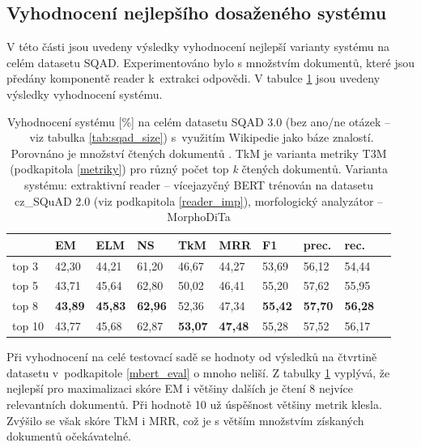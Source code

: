 \subsection{Vyhodnocení nejlepšího dosaženého systému}
\label{best_eval}
V této části jsou uvedeny výsledky vyhodnocení nejlepší varianty systému na celém datasetu SQAD. Experimentováno bylo s množstvím dokumentů, které jsou předány komponentě reader k~extrakci odpovědi. V tabulce \ref{tab:final_evaluation} jsou uvedeny výsledky vyhodnocení systému.
\begin{table}[H]
    \centering
    \begin{tabular}{|l||l|l|l|l|l|l|l|l|l|}
        \hline
          & \textbf{EM}   & ELM       & NS        & TkM       & MRR       & \textbf{F1}   & prec.         & rec. \\ \hline\hline
            top 3    & 42,30         & 44,21     & 61,20     & 46,67     & 44,27     & 53,69         & 56,12         & 54,44    \\ \hline
            top 5    & 43,71         & 45,64     & 62,80     & 50,02     & 46,41     & 55,20         & 57,62         & 55,95    \\ \hline
            top 8   & \textbf{43,89}         & \textbf{45,83}     & \textbf{62,96}     & 52,36     & 47,34     & \textbf{55,42}         & \textbf{57,70}         & \textbf{56,28}    \\ \hline
            top 10   & 43,77         & 45,68     & 62,87     & \textbf{53,07}     & \textbf{47,48}     & 55,28         & 57,52        & 56,17    \\ \hline
    \end{tabular}
    \caption{Vyhodnocení systému [\%] na celém datasetu SQAD 3.0 (bez ano/ne otázek --~viz tabulka \ref{tab:sqad_size}) s~využitím Wikipedie jako báze znalostí. Porovnáno je množství čtených dokumentů . TkM je varianta metriky T3M (podkapitola \ref{metriky}) pro různý počet top \emph{k} čtených dokumentů. Varianta systému: extraktivní reader -- vícejazyčný BERT trénován na datasetu cz\_SQuAD 2.0 (viz podkapitola \ref{reader_imp}), morfologický analyzátor -- MorphoDiTa}
    \label{tab:final_evaluation}
\end{table}
Při vyhodnocení na celé testovací sadě se hodnoty od výsledků na čtvrtině datasetu v~podkapitole \ref{mbert_eval} o mnoho neliší. Z tabulky \ref{tab:final_evaluation} vyplývá, že nejlepší pro maximalizaci skóre EM i většiny dalších je čtení 8 nejvíce relevantních dokumentů. Při hodnotě 10 už úspěšnost většiny metrik klesla. Zvýšilo se však skóre TkM i MRR, což je s větším množstvím získaných dokumentů očekávatelné.

